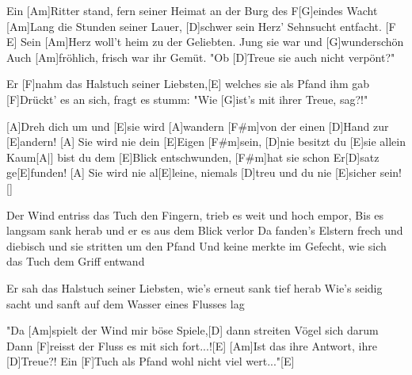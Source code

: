 

\begin{guitar}
	Ein [Am]Ritter stand, fern seiner Heimat an der Burg des F[G]eindes Wacht
	[Am]Lang die Stunden seiner Lauer, [D]schwer sein Herz' Sehnsucht entfacht. [F E]{}
	Sein [Am]Herz woll't heim zu der Geliebten. Jung sie war und [G]wunderschön
	Auch [Am]fröhlich, frisch war ihr Gemüt. "Ob [D]Treue sie auch nicht verpönt?"
	
	Er [F]nahm das Halstuch seiner Liebsten,[E] welches sie als Pfand ihm gab
	[F]Drückt' es an sich, fragt es stumm: "Wie [G]ist's mit ihrer Treue, sag?!"
	
	[A]Dreh dich um und [E]sie wird [A]wandern [F#m]von der einen [D]Hand zur [E]andern!
	[A] Sie wird nie dein [E]Eigen [F#m]sein, [D]nie besitzt du [E]sie allein
	Kaum[A|] bist du dem [E]Blick entschwunden, [F#m]hat sie schon Er[D]satz ge[E]funden!
	[A] Sie wird nie al[E]leine, niemals [D]treu und du nie [E]sicher sein! []{}
	
	Der Wind entriss das Tuch den Fingern, trieb es weit und hoch empor,
	Bis es langsam sank herab und er es aus dem Blick verlor
	Da fanden's Elstern frech und diebisch und sie stritten um den Pfand
	Und keine merkte im Gefecht, wie sich das Tuch dem Griff entwand
	
	Er sah das Halstuch seiner Liebsten, wie's erneut sank tief herab
	Wie's seidig sacht und sanft auf dem Wasser eines Flusses lag
	
	 

	"Da [Am]spielt der Wind mir böse Spiele,[D] dann streiten Vögel sich darum
	Dann [F]reisst der Fluss es mit sich fort...![E]{}
	[Am]Ist das ihre Antwort, ihre [D]Treue?!
	Ein [F]Tuch als Pfand wohl nicht viel wert..."[E]{}
	
	 
\end{guitar}